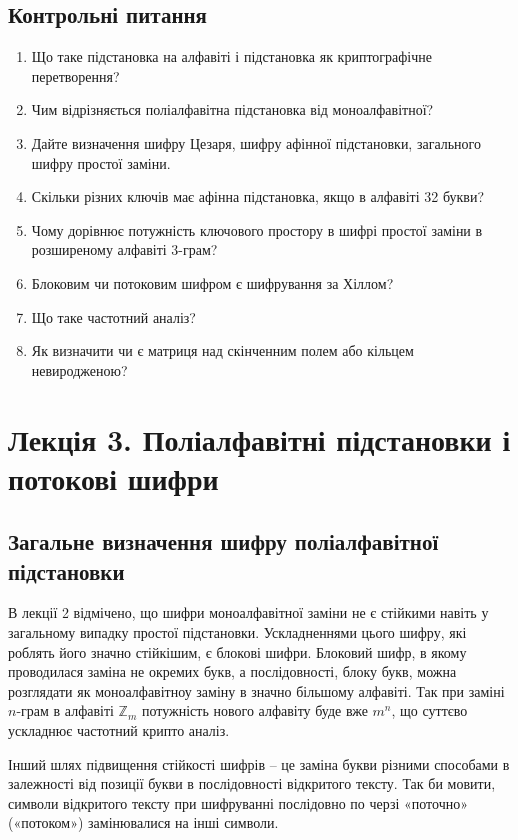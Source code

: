 \subsection{Контрольні питання}
\begin{enumerate}
    \item Що таке підстановка на алфавіті і підстановка як криптографічне перетворення?
    \item Чим відрізняється поліалфавітна підстановка від моноалфавітної?
    \item Дайте визначення шифру Цезаря, шифру афінної підстановки, загального шифру
    простої заміни.
    \item Скільки різних ключів має афінна підстановка, якщо в алфавіті 32 букви?
    \item Чому дорівнює потужність ключового простору в шифрі простої заміни в
    розширеному алфавіті 3-грам?
    \item Блоковим чи потоковим шифром є шифрування за Хіллом?
    \item Що таке частотний аналіз?
    \item Як визначити чи є матриця над скінченним полем або кільцем невиродженою?
\end{enumerate}

\section[Поліалфавітні підстановки і потокові шифри]{Лекція 3. Поліалфавітні підстановки і потокові шифри}

\subsection{Загальне визначення шифру поліалфавітної підстановки}

В лекції 2 відмічено, що шифри моноалфавітної заміни не є стійкими
навіть у загальному випадку простої підстановки. Ускладненнями цього
шифру, які роблять його значно стійкішим, є блокові шифри. Блоковий шифр,
в якому проводилася заміна не окремих букв, а послідовності, блоку букв,
можна розглядати як моноалфавітноу заміну в значно більшому алфавіті. Так
при заміні $n$-грам в алфавіті $\mathbb{Z}_m$ потужність нового алфавіту
буде вже $m^n$, що суттєво ускладнює частотний крипто аналіз.

Інший шлях підвищення стійкості шифрів – це заміна букви різними
способами в залежності від позиції букви в послідовності відкритого тексту.
Так би мовити, символи відкритого тексту при шифруванні послідовно по
черзі «поточно» («потоком») замінювалися на інші символи.

